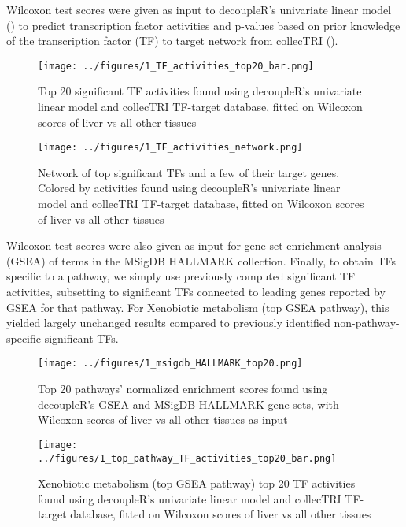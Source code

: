 \documentclass{article}
\begin{document}
Wilcoxon test scores were given as input to decoupleR's univariate linear model (\cite{Badia-I-Mompel2022-wj}) to predict transcription factor activities and p-values based on prior knowledge of the transcription factor (TF) to target network from collecTRI (\cite{Muller-Dott2023-ve}).

\begin{figure}[htbp]
  \centering
  \texttt{[image: ../figures/1\_TF\_activities\_top20\_bar.png]}
  \caption{Top 20 significant TF activities found using decoupleR's univariate linear model and collecTRI TF-target database, fitted on Wilcoxon scores of liver vs all other tissues}
  \label{fig:1_TF_activities_top20_bar}
\end{figure}

\begin{figure}[htbp]
  \centering
  \texttt{[image: ../figures/1\_TF\_activities\_network.png]}
  \caption{Network of top significant TFs and a few of their target genes. Colored by activities found using decoupleR's univariate linear model and collecTRI TF-target database, fitted on Wilcoxon scores of liver vs all other tissues}
  \label{fig:1_TF_activities_top20_bar}
\end{figure}
\FloatBarrier

Wilcoxon test scores were also given as input for gene set enrichment analysis (GSEA) of terms in the MSigDB HALLMARK collection. Finally, to obtain TFs specific to a pathway, we simply use previously computed significant TF activities, subsetting to significant TFs connected to leading genes reported by GSEA for that pathway. For Xenobiotic metabolism (top GSEA pathway), this yielded largely unchanged results compared to previously identified non-pathway-specific significant TFs. 

\begin{figure}[htbp]
  \centering
  \texttt{[image: ../figures/1\_msigdb\_HALLMARK\_top20.png]}
  \caption{Top 20 pathways' normalized enrichment scores found using decoupleR's GSEA and MSigDB HALLMARK gene sets, with Wilcoxon scores of liver vs all other tissues as input}
  \label{fig:1_msigdb_HALLMARK_top20}
\end{figure}

\begin{figure}[htbp]
  \centering
  \texttt{[image: ../figures/1\_top\_pathway\_TF\_activities\_top20\_bar.png]}
  \caption{Xenobiotic metabolism (top GSEA pathway) top 20 TF activities found using decoupleR's univariate linear model and collecTRI TF-target database, fitted on Wilcoxon scores of liver vs all other tissues}
  \label{fig:1_top_pathway_TF_activities_top20_bar}
\end{figure}
\end{document}
